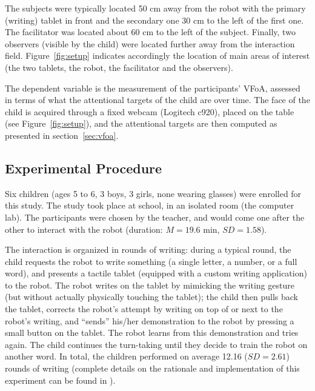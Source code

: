\documentclass{sig-alternate}
\newcommand{\redacted}{\textit{\sc [REDACTED FOR REVIEW]}\xspace}
\begin{document}
The subjects were typically located 50 cm away from the robot with the primary
(writing) tablet in front and the secondary one 30 cm to the left of the first
one.  The facilitator was located about 60 cm to the left of the subject.
Finally, two observers (visible by the child) were located further away from the
interaction field.  Figure~\ref{fig:setup} indicates accordingly the location of
main areas of interest (the two tablets, the robot, the facilitator and the
observers).


The dependent variable is the measurement of the participants' VFoA, assessed in
terms of what the attentional targets of the child are over time. The face of
the child is acquired through a fixed webcam (Logitech {\sf c920}), placed on
the table (see Figure~\ref{fig:setup}), and the attentional targets are then
computed as presented in section~\ref{sec:vfoa}.


\subsection{Experimental Procedure}

Six children (ages 5 to 6, 3 boys, 3 girls, none wearing glasses) were enrolled
for this study.  The study took place at school, in an isolated room (the
computer lab). The participants were chosen by the teacher, and would come one
after the other to interact with the robot (duration: $M=19.6$ min, $SD=1.58$).

The interaction is organized in rounds of writing: during a typical round, the
child requests the robot to write something (a single letter, a number, or a
full word), and presents a tactile tablet (equipped with a custom writing
application) to the robot. The robot writes on the tablet by mimicking the
writing gesture (but without actually physically touching the tablet); the child
then pulls back the tablet, corrects the robot's attempt by writing on top of or
next to the robot's writing, and ``sends'' his/her demonstration to the robot by
pressing a small button on the tablet. The robot learns from this demonstration
and tries again. The child continues the turn-taking until they decide to train
the robot on another word. In total, the children performed on average 12.16
($SD=2.61$) rounds of writing (complete details on the rationale and
implementation of this experiment can be found in \redacted).
\end{document}

